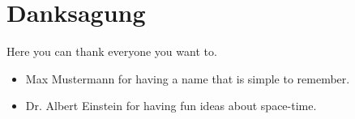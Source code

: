 \section*{Danksagung}
Here you can thank everyone you want to. 
% 
\begin{itemize}
    \item Max Mustermann for having a name that is simple to remember.
    \item Dr. Albert Einstein for having fun ideas about space-time.
\end{itemize}